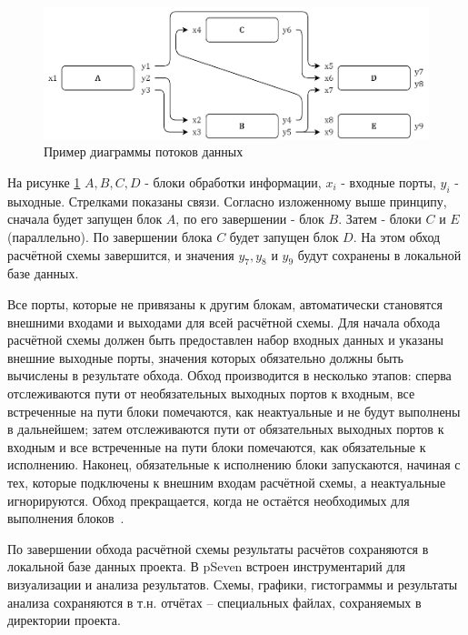 \begin{figure}[h]
    \centering
    \includegraphics[width=\textwidth]{ResearchNotes/rndhpc_not_blo_2022_02_09/dataflow.png}
    \caption{Пример диаграммы потоков данных}
    \label{fig:dataflow}
\end{figure}

На рисунке \ref{fig:dataflow} $A, B, C, D$ - блоки обработки информации, $x_i$ - входные порты, $y_i$ - выходные. Стрелками показаны связи. Согласно изложенному выше принципу, сначала будет запущен блок $A$, по его завершении - блок $B$. Затем - блоки $C$ и $E$ (параллельно). По завершении блока $C$ будет запущен блок $D$. На этом обход расчётной схемы завершится, и значения $y_7, y_8$ и $y_9$ будут сохранены в локальной базе данных.

\begin{remark}
Все порты, которые не привязаны к другим блокам, автоматически становятся внешними входами и выходами для всей расчётной схемы. Для начала обхода расчётной схемы должен быть предоставлен набор входных данных и указаны внешние выходные порты, значения которых обязательно должны быть вычислены в результате обхода. Обход производится в несколько этапов: сперва отслеживаются пути от необязательных выходных портов к входным, все встреченные на пути блоки помечаются, как неактуальные и не будут выполнены в дальнейшем; затем отслеживаются пути от обязательных выходных портов к входным и все встреченные на пути блоки помечаются, как обязательные к исполнению. Наконец, обязательные к исполнению блоки запускаются, начиная с тех, которые подключены к внешним входам расчётной схемы, а неактуальные игнорируются. Обход прекращается, когда не остаётся необходимых для выполнения блоков~\cite{Nazarenko2015}.
\end{remark}

По завершении обхода расчётной схемы результаты расчётов сохраняются в локальной базе данных проекта. В pSeven встроен инструментарий для визуализации и анализа результатов. Схемы, графики, гистограммы и результаты анализа сохраняются в т.н. отчётах -- специальных файлах, сохраняемых в директории проекта.

